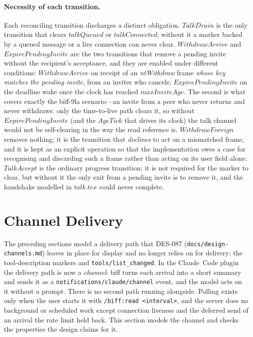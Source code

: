 \documentclass[a4paper,10pt,fleqn]{article}
\begin{document}
\paragraph{Necessity of each transition.}  Each reconciling transition
discharges a distinct obligation.  $TalkDrain$ is the only transition
that clears $talkQueued$ or $talkConnected$; without it a marker backed
by a queued message or a live connection can never clear.
$WithdrawArrive$ and $ExpirePendingInvite$ are the two transitions that
remove a pending invite without the recipient's acceptance, and they are
enabled under different conditions: $WithdrawArrive$ on receipt of an
\emph{ntWithdraw} frame \emph{whose key matches the pending invite}, from an
inviter who cancels; $ExpirePendingInvite$ on the deadline wake once the clock
has reached $maxInviteAge$.  The second is
what covers exactly the biff-9la scenario---an invite from a peer who
never returns and never withdraws: only the time-to-live path clears it,
so without $ExpirePendingInvite$ (and the $AgeTick$ that drives its
clock) the talk channel would not be self-clearing in the way the read
reference is.  $WithdrawForeign$ removes nothing; it is the transition that
\emph{declines} to act on a mismatched frame, and it is kept as an explicit
operation so that the implementation owes a case for recognising and
discarding such a frame rather than acting on its user field alone.
$TalkAccept$ is the ordinary progress transition; it is not
required for the marker to clear, but without it the only exit from a
pending invite is to remove it, and the handshake modelled in $talk.tex$
could never complete.

\section{Channel Delivery}
\label{sec:channel}

The preceding sections model a delivery path that DES-087
(\texttt{docs/design-channels.md}) leaves in place for display and no
longer relies on for delivery: the tool-description markers and
\texttt{tools/list\_changed}.  In the Claude~Code plugin the delivery path
is now a \emph{channel}: biff turns each arrival into a short summary and
sends it as a \texttt{notifications/claude/channel} event, and the model
acts on it without a prompt.  There is no second path running alongside.
Polling exists only when the user starts it with \texttt{/biff:read
<interval>}, and the server does no background or scheduled work except
connection liveness and the deferred send of an arrival the rate limit held
back.  This section models the channel and checks the properties the design
claims for it.
\end{document}
